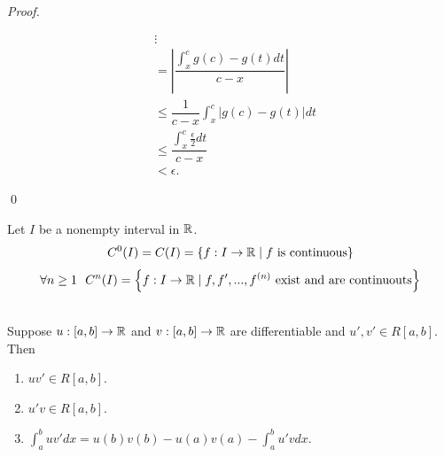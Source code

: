 \begin{proof}
\begin{enumerate}
\begin{enumerate}
\begin{description}
\begin{align*}
                    &\vdots \\ 
                    &= \left|\dfrac{\int_x^c g(c) - g(t)dt}{c-x}\right| \\ 
                    &\leq \dfrac{1}{c-x} \int_x^c |g(c) - g(t)| dt \\
                    &\leq \dfrac{\int_x^c \frac{\epsilon}{2}dt}{c-x} \\
                    &< \epsilon.
                \end{align*}
            \end{description}
        \end{enumerate}
    \end{enumerate}
    \qed
\end{proof}

\begin{notation}
    Let $I$ be a nonempty interval in $\mathbb{R}$.
    $$C^0(I) = C(I) = \left\{f: I \to \mathbb{R} \mid \text{$f$ is continuous}\right\}$$
    $$\forall n \geq 1 ~~C^n(I) = \left\{f: I \to \mathbb{R} \mid f, f', ..., f^{(n)} \text{ exist and are continuouts}\right\}$$
\end{notation}

\begin{theorem} \leavevmode \\
    \label{Thm6.22}
    Suppose $u: [a,b] \to \mathbb{R}$ and $v:[a,b] \to \mathbb{R}$ are differentiable and $u', v'\in R[a,b]$. Then
    \begin{enumerate}
        \item $uv' \in R[a,b].$
        \item $u'v \in R[a,b].$
        \item $\int_a^buv' dx = u(b)v(b) - u(a)v(a) - \int_a^b u'vdx.$
    \end{enumerate}
\end{theorem}

